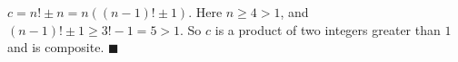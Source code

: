 $c=n!\pm n=n\left((n-1)!\pm1\right)$. Here $n\ge4>1$, and $(n-1)!\pm1\ge3!-1=5>1$. So $c$ is a product of two integers greater than $1$ and is composite. $\blacksquare$
